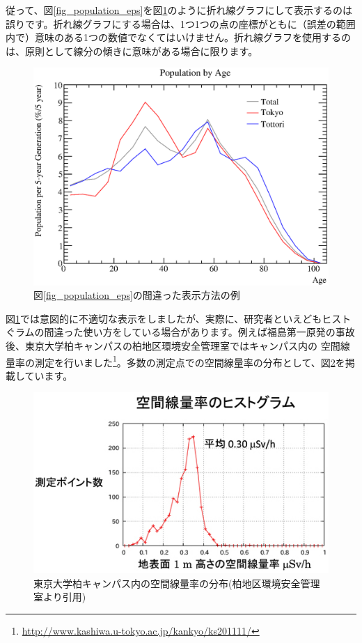従って、図\ref{fig_population_eps}を図\ref{fig_population2_eps}のように折れ線グラフにして表示するのは誤りです。折れ線グラフにする場合は、1つ1つの点の座標がともに（誤差の範囲内で）意味のある1つの数値でなくてはいけません。折れ線グラフを使用するのは、原則として線分の傾きに意味がある場合に限ります。

\begin{figure}
  \centering
  \includegraphics[width=12cm,clip]{fig/population2.eps}
  \caption{図\ref{fig_population_eps}の間違った表示方法の例}
  \label{fig_population2_eps}
\end{figure}

図\ref{fig_population2_eps}では意図的に不適切な表示をしましたが、実際に、研究者といえどもヒストぐラムの間違った使い方をしている場合があります。例えば福島第一原発の事故後、東京大学柏キャンパスの柏地区環境安全管理室ではキャンパス内の 空間線量率の測定を行いました\footnote{\url{http://www.kashiwa.u-tokyo.ac.jp/kankyo/ks201111/}}。多数の測定点での空間線量率の分布として、図\ref{fig_Kashiwa_png}を掲載しています。

\begin{figure}
  \centering
  \includegraphics[scale=0.8]{fig/Kashiwa.png}
  \caption{東京大学柏キャンパス内の空間線量率の分布(柏地区環境安全管理室より引用)}
  \label{fig_Kashiwa_png}
\end{figure}

